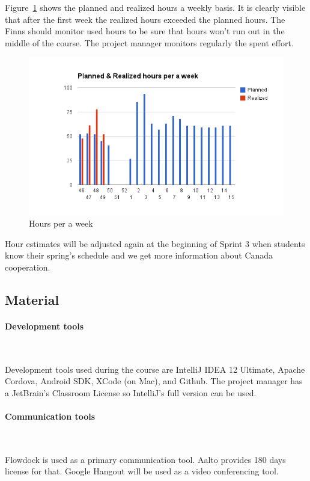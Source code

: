 Figure~\ref{fig:hours_weeks} shows the planned and realized hours a weekly
basis. It is clearly visible that after the first week the realized hours
exceeded the planned hours. The Finns should monitor used hours to be sure that
hours won't run out in the middle of the course. The project manager monitors
regularly the spent effort.

\begin{figure}[H]
\centering
\includegraphics[width=1\textwidth]{imgs/chart_2.png}
\caption{Hours per a week}
\label{fig:hours_weeks}
\end{figure}

Hour estimates will be adjusted again at the beginning of Sprint 3 when students
know their spring's schedule and we get more information about Canada
cooperation.

\subsection{Material}

\paragraph{Development tools}~

Development tools used during the course are IntelliJ IDEA 12
Ultimate, Apache Cordova, Android SDK, XCode (on Mac), and Github. The project
manager has a JetBrain's Classroom License so IntelliJ's full version can be
used.

\paragraph{Communication tools}~

Flowdock is used as a primary communication tool. Aalto provides 180 days
license for that. Google Hangout will be used as a video conferencing tool.

